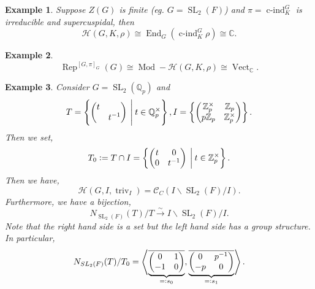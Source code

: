 \documentclass[8pt]{article}
\newtheorem{example}{Example}[section]
\DeclareMathOperator{\triv}{triv}
\DeclareMathOperator{\cind}{c-ind}
\DeclareMathOperator{\SL}{SL}
\DeclareMathOperator{\Rep}{Rep}
\DeclareMathOperator{\End}{End}
\DeclareMathOperator{\Mod}{Mod}
\DeclareMathOperator{\Vect}{Vect}
\newcommand{\defeq}{\vcentcolon=}
\newcommand{\defqe}{=\vcentcolon}
\newcommand{\Z}[0]{\mathbb{Z}}
\newcommand{\C}[0]{\mathbb{C}}
\newcommand{\Q}[0]{\mathbb{Q}}
\newcommand{\hecke}[0]{\mathscr{H}}
\begin{document}
\begin{example}
  Suppose $Z(G)$ is finite (eg. $G=\SL_2(F)$) and $\pi=\cind_K^G$ is irreducible and supercuspidal, then 
  \begin{equation*}
    \hecke(G,K,\rho)\cong\End_G(\cind_K^G\rho)\cong\C.
  \end{equation*}
\end{example}

\begin{example}
  \begin{equation*}
    \Rep^{[G,\pi]_G}(G)\cong\Mod-\hecke(G,K,\rho)\cong\Vect_\C.
  \end{equation*}
\end{example}

\begin{example}
  Consider $G=\SL_2(\Q_p)$ and 
  \begin{equation*}
    T = \left\{\begin{pmatrix}
    t & \:\\
    \: & t^{-1}
    \end{pmatrix}\:\Bigg{|}\: t\in\Q^\times_p\right\}, I = \left\{\begin{pmatrix}
      \Z_p^\times & \Z_p\\
      p\Z_p & \Z_p^\times
    \end{pmatrix}
    \right\}.
  \end{equation*}
  Then we set,
  \begin{equation*}
    T_0\defeq T\cap I = \left\{\begin{pmatrix}
      t & 0\\
      0 & t^{-1}
    \end{pmatrix}\:\bigg{|}\: t\in\Z_p^\times\right\}.
  \end{equation*}
  Then we have,
  \begin{equation*}
    \hecke(G,I,\triv_I)=\mathcal{C}_C(I\backslash\SL_2(F)/I).
  \end{equation*}
  Furthermore, we have a bijection,
  \begin{equation*}
    N_{\SL_2(F)}(T)/T\stackrel{\sim}{\to}I\backslash\SL_2(F)/I.
  \end{equation*}
  Note that the right hand side is a set but the left hand side has a group structure. In particular,
  \begin{equation*}
    N_{SL_2(F)}(T)/T_0=\left\langle\underbrace{\overline{\begin{pmatrix}0 & 1\\ -1 & 0 \end{pmatrix}}}_{\defqe s_0},\underbrace{\overline{\begin{pmatrix}0 & p^{-1}\\ -p & 0 \end{pmatrix}}}_{\defqe s_1}\right\rangle.

\end{equation*}
\end{example}
\end{document}
